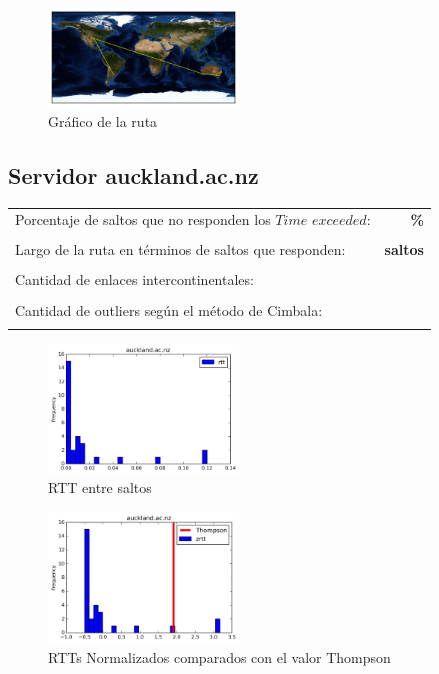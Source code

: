\begin{figure}[H]
  \centering
    \includegraphics[width=0.45\textwidth]{grafico-rutas/www-uq-edu-au.png}
  \caption{Gráfico de la ruta}
  \label{entropia-s}
\end{figure}





\subsection{Servidor auckland.ac.nz}

\begin{center}
\begin{tabular}{p{6.5cm}r}
Porcentaje de saltos que no responden los $Time$ $exceeded$: & \textbf{\%} \\ \\ 
Largo de la ruta en términos de saltos que responden: &\textbf{ saltos} \\ \\
Cantidad de enlaces intercontinentales: & \textbf{} \\ \\
Cantidad de outliers según el método de Cimbala: & \textbf{} \\ \\
\end{tabular}
\end{center}

\begin{figure}[H]
  \centering
    \includegraphics[width=0.45\textwidth]{histogramas_rtt/auckland-ac-nz.png}
  \caption{RTT entre saltos}
  \label{entropia-s}
\end{figure}

\begin{figure}[H]
  \centering
    \includegraphics[width=0.45\textwidth]{histogramas_thompson/auckland-ac-nz.png}
  \caption{RTTs Normalizados comparados con el valor Thompson}
  \label{entropia-s}
\end{figure}

